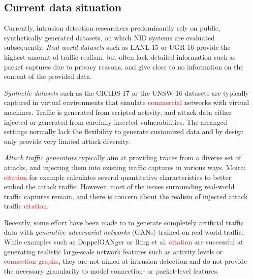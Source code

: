 \documentclass[sigconf]{acmart}
\begin{document}

\subsection{Current data situation}

Currently, intrusion detection researchers predominantly rely on public, synthetically generated datasets, on which NID systems are evaluated subsequently.
\textit{Real-world datasets} such as LANL-15 \cite{kent-2015-cyberdata1} or UGR-16 \cite{macia2018ugr} provide the highest amount of traffic realism, but often lack detailed information such as packet captures due to privacy reasons, and give close to no information on the content of the provided data. 

\textit{Synthetic datasets} such as the CICIDS-17 \cite{sharafaldin2018towards} or the UNSW-16  \cite{moustafa2015unsw} datasets are typically captured in virtual environments that simulate \textcolor{red}{commercial} networks with virtual machines. Traffic is generated from scripted activity, and attack data either injected or generated from carefully inserted vulnerabilities. The arranged settings normally lack the flexibility to generate customized data and by design only provide very limited attack diversity.

\textit{Attack traffic generators} typically aim at providing traces from a diverse set of attacks, and injecting them into existing traffic captures in various ways. Moirai \textcolor{red}{citation} for example calculates several quantitative characteristics to better embed the attack traffic.  However, most of the issues surrounding real-world traffic captures remain, and there is concern about the realism of injected attack traffic \textcolor{red}{citation}.

Recently, some effort have been made to to generate completely artificial traffic data with \textit{generative adversarial networks} (GANs) trained on real-world traffic. While examples such as DoppelGANger or Ring et al. \textcolor{red}{citation} are successful at generating realistic large-scale network features such as activity levels or \textcolor{red}{connection graphs}, they are not aimed at intrusion detection and do not provide the necessary granularity to model connection- or packet-level features.
\end{document}
